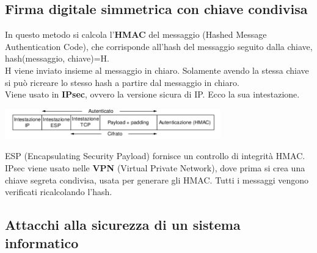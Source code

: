 \documentclass[10pt,a4paper,twoside]{article}
\begin{document}
\subsection{Firma digitale simmetrica con chiave condivisa}
In questo metodo si calcola l'\textbf{HMAC} del messaggio (Hashed Message Authentication Code), che corrisponde all'hash del messaggio seguito dalla chiave, hash(messaggio, chiave)=H.\\
H viene inviato insieme al messaggio in chiaro. Solamente avendo la stessa chiave si può ricreare lo stesso hash a partire dal messaggio in chiaro.\\
Viene usato in \textbf{IPsec}, ovvero la versione sicura di IP. Ecco la sua intestazione.
\begin{center}
\includegraphics[width=0.7\textwidth]{images/ipsec.png}
\end{center}
ESP (Encapsulating Security Payload) fornisce un controllo di integrità HMAC.\\
IPsec viene usato nelle \textbf{VPN} (Virtual Private Network), dove prima si crea una chiave segreta condivisa, usata per generare gli HMAC. Tutti i messaggi vengono verificati ricalcolando l'hash.

\subsection{Attacchi alla sicurezza di un sistema informatico}
\end{document}
